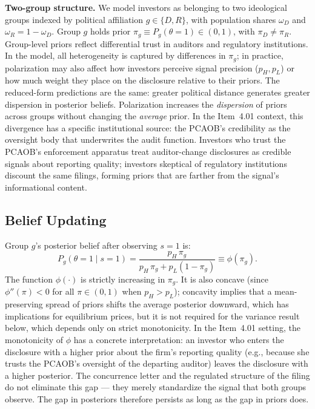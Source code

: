 \documentclass[12pt]{article}
\begin{document}
\textbf{Two-group structure.} We model investors as belonging to two
ideological groups indexed by political affiliation $g \in \{D, R\}$, with
population shares $\omega_D$ and $\omega_R = 1 - \omega_D$. Group $g$ holds
prior $\pi_g \equiv P_g(\theta = 1) \in (0,1)$, with $\pi_D \neq \pi_R$.
Group-level priors reflect differential trust in auditors and regulatory
institutions. In the model, all heterogeneity is captured by differences
in $\pi_g$; in practice, polarization may also affect how investors perceive
signal precision ($p_H, p_L$) or how much weight they place on the disclosure
relative to their priors. The reduced-form predictions are the same: greater
political distance generates greater dispersion in posterior beliefs.
Polarization increases the \emph{dispersion} of priors across groups without
changing the \emph{average} prior. In the Item~4.01 context, this divergence
has a specific institutional source: the PCAOB's credibility as the oversight
body that underwrites the audit function. Investors who trust the PCAOB's
enforcement apparatus treat auditor-change disclosures as credible signals
about reporting quality; investors skeptical of regulatory institutions
discount the same filings, forming priors that are farther from the
signal's informational content.

\subsection{Belief Updating}

Group $g$'s posterior belief after observing $s=1$ is:
\begin{equation}
    \label{eq:bayes}
    P_g(\theta = 1 \mid s = 1)
    = \frac{p_H \, \pi_g}{p_H \, \pi_g + p_L (1 - \pi_g)}
    \equiv \phi(\pi_g).
\end{equation}
The function $\phi(\cdot)$ is strictly increasing in $\pi_g$. It is also concave
(since $\phi''(\pi) < 0$ for all $\pi \in (0,1)$ when $p_H > p_L$); concavity
implies that a mean-preserving spread of priors shifts the average posterior
downward, which has implications for equilibrium prices, but it is not required
for the variance result below, which depends only on strict monotonicity.
In the Item~4.01 setting, the monotonicity of $\phi$ has a concrete
interpretation: an investor who enters the disclosure with a higher prior
about the firm's reporting quality (e.g., because she trusts the PCAOB's
oversight of the departing auditor) leaves the disclosure with a higher
posterior. The concurrence letter and the regulated structure of the filing
do not eliminate this gap --- they merely standardize the signal that
both groups observe. The gap in posteriors therefore persists as long
as the gap in priors does.
\end{document}
